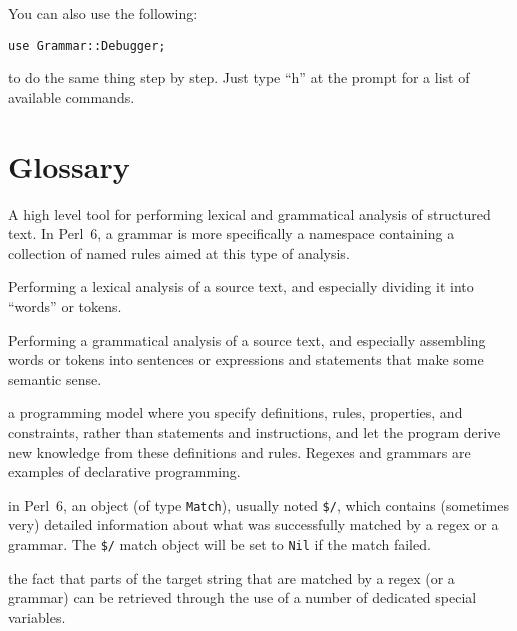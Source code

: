 You can also use the following:

\begin{verbatim}
use Grammar::Debugger;
\end{verbatim}

to do the same thing step by step. Just type ``h'' at the 
prompt for a list of available commands.


\section{Glossary}

\begin{description}

\item[Grammar] A high level tool for performing lexical and 
grammatical analysis of structured text. In Perl~6, 
a grammar is more specifically a namespace containing a 
collection of named rules aimed at this type of analysis.

\item[Lexing] Performing a lexical analysis of a source text, and especially dividing it into ``words'' or tokens.

\item[Parsing] Performing a grammatical analysis of a source text, 
and especially assembling words or tokens into sentences or 
expressions and statements that make some semantic sense. 

\item[Declarative programming] a programming model where you 
specify definitions, rules, properties, and constraints, rather 
than statements and instructions, and let the program derive 
new knowledge from these definitions and rules. Regexes and 
grammars are examples of declarative programming.

\item[Match object] in Perl~6, an object (of type {\tt Match}), 
usually noted \verb'$/', which contains (sometimes very) 
detailed information about what was successfully matched 
by a regex or a grammar. The \verb'$/' match object will be 
set to {\tt Nil} if the match failed.

\item[Capture] the fact that parts of the target string that 
are matched by a regex (or a grammar) can be retrieved through 
the use of a number of dedicated special variables.


\end{description}
